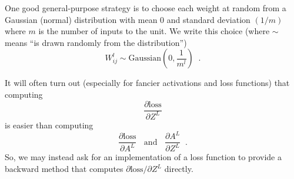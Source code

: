One good general-purpose strategy is to choose each weight at random
from a Gaussian (normal) distribution with mean 0 and standard
deviation $(1/m)$ where $m$ is the number of inputs to the unit.
  We write this choice (where $\sim$ means ``is drawn
randomly from the distribution'')
    \[W^l_{ij} \sim \text{Gaussian}\left(0,
        \frac{1}{m^l}\right)\;\;.\]

It will often turn out (especially for fancier activations and loss
functions) that computing
\[\frac{\partial \text{loss}}{\partial Z^L}\] is easier than computing
\[\frac{\partial \text{loss}}{\partial A^L}\;\;\text{ and }\;\;\frac{\partial A^L}
{\partial Z^L}\;\;.\] 
So, we may instead ask for an 
implementation of a loss function to provide a backward method that
computes $\partial \text{loss}/\partial Z^L$ directly.


